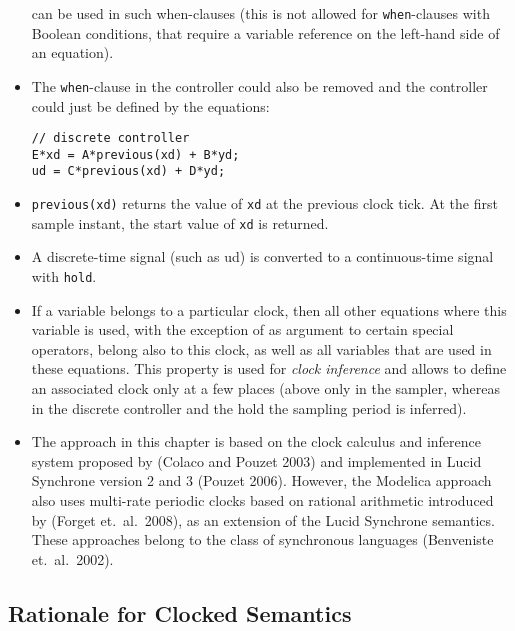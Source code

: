 \begin{nonnormative}
\begin{itemize}
  can be used in such when-clauses (this is not allowed for
  \lstinline!when!-clauses with Boolean conditions, that require a variable
  reference on the left-hand side of an equation).
\item
  The \lstinline!when!-clause in the controller could also be removed
  and the controller could just be defined by the equations:
\begin{lstlisting}[language=modelica]
// discrete controller
E*xd = A*previous(xd) + B*yd;
ud = C*previous(xd) + D*yd;
\end{lstlisting}
\item
  \lstinline!previous(xd)! returns the value of \lstinline!xd! at
  the previous clock tick. At the first sample instant, the start value
  of \lstinline!xd! is returned.
\item
  A discrete-time signal (such as ud) is converted to a continuous-time signal with \lstinline!hold!.
\item
  If a variable belongs to a particular clock, then all other
  equations where this variable is used, with the exception of as
  argument to certain special operators, belong also to this clock, as
  well as all variables that are used in these equations. This property
  is used for \emph{clock inference} and allows to define an associated
  clock only at a few places (above only in the sampler, whereas in the
  discrete controller and the hold the sampling period is inferred).
\item
  The approach in this chapter is based on the clock calculus and
  inference system proposed by (Colaco and Pouzet 2003) and implemented
  in Lucid Synchrone version 2 and 3 (Pouzet 2006). However, the
  Modelica approach also uses multi-rate periodic clocks based on
  rational arithmetic introduced by (Forget et.~al.\ 2008), as an
  extension of the Lucid Synchrone semantics. These approaches belong to
  the class of synchronous languages (Benveniste et.~al.\ 2002).
\end{itemize}
\end{nonnormative}

\subsection{Rationale for Clocked Semantics}\label{rationale-for-clocked-semantics}

